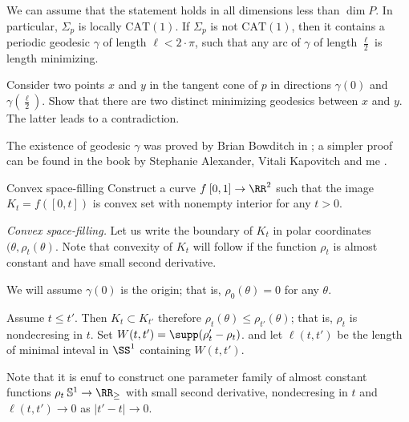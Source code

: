 We can assume that the statement holds in all dimensions less than $\dim P$. 
In particular, $\Sigma_p$ is locally $\mathrm{CAT}(1)$.
If $\Sigma_p$ is not $\mathrm{CAT}(1)$,
then it contains a periodic geodesic $\gamma$ of length $\ell<2\cdot\pi$,
such that any arc of $\gamma$ of length $\tfrac\ell2$ is length minimizing.

Consider two points $x$ and $y$
in the tangent cone of $p$
in directions $\gamma(0)$ and $\gamma(\tfrac\ell2)$.
Show that there are two distinct minimizing geodesics between $x$ and $y$.
The latter leads to a contradiction.
\qeds

The existence of geodesic $\gamma$ was proved by Brian Bowditch in \cite{bowditch};
a simpler proof can be found in the book 
by Stephanie Alexander, Vitali Kapovitch and me \cite[see][]{akp}.















\begin{pr}{\thm}{Convex space-filling}\label{Convex space-filling}
Construct a curve $f\:[0,1]\to \RR^2$
such that 
the image $K_t=f([0,t])$ is convex set with nonempty interior
for any $t>0$. 
\end{pr}

\textit{Convex space-filling.}
Let us write the boundary of $K_t$
in polar coordinates $(\theta,\rho_t(\theta)$.
Note that convexity of $K_t$ will follow if the function $\rho_t$ is almost constant and have small second derivative.

We will assume $\gamma(0)$ is the origin;
that is, $\rho_0(\theta)=0$ for any $\theta$.

Assume $t\le t'$.
Then $K_t\subset K_{t'}$ 
therefore 
$\rho_t(\theta)\le \rho_{t'}(\theta)$;
that is, $\rho_t$ is nondecresing in $t$.
Set $W(t,t')=\supp(\rho_t'-\rho_t)$.
and let $\ell(t,t')$ be the length of minimal inteval in $\SS^1$ containing $W(t,t')$.

Note that it is enuf to construct one parameter family of almost constant functions $\rho_t\:\mathbb{S}^1\to \RR_\ge$
with small second derivative,
nondecresing in $t$ and $\ell(t,t')\to 0$ as $|t'-t|\to 0$.








